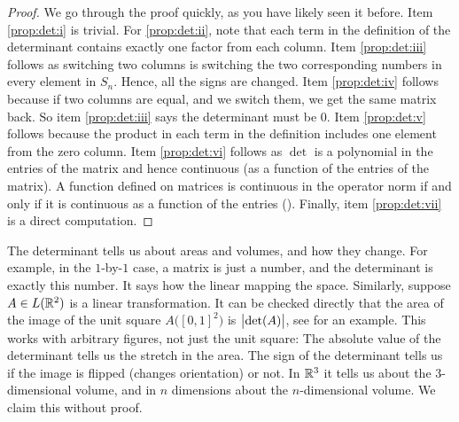 \begin{proof}
We go through the proof quickly, as you have likely seen it before.
%
Item \ref{prop:det:i} is trivial.  For \ref{prop:det:ii}, note that each term in the definition of the
determinant contains exactly one factor from each column.
%
Item \ref{prop:det:iii} follows as switching two columns is switching the
two corresponding numbers in every element in $S_n$.  Hence, all the signs
are changed.
Item \ref{prop:det:iv} follows because if two columns are equal, and we
switch them, we get
the same matrix back.  So item \ref{prop:det:iii} says the determinant must be 0.
%
Item \ref{prop:det:v} follows because the product in each term in the definition includes
one element from the zero column.
Item \ref{prop:det:vi} follows as $\det$ is a polynomial in the entries of the matrix
and hence continuous (as a function of the entries of the matrix).
A function defined on
matrices is continuous in the operator norm if and only if it is 
continuous as a function of the entries ().
Finally, item \ref{prop:det:vii} is a direct computation.
\end{proof}

The determinant tells us about areas and volumes, and how they change.
For example, in the $1$-by-$1$ case, a matrix is just a number, and the
determinant is exactly this number.  It says how the linear mapping
 the space.  Similarly,
suppose $A \in L({\mathbb{R}}^2)$ is a linear transformation.
It can be checked directly that
the area of the image of the unit square $A\bigl([0,1]^2\bigr)$ is
$\bigl\lvert {\det(A)} \bigr\rvert$, see  for an example.
This works with arbitrary figures, not just the unit
square:
The absolute value of the determinant tells us the stretch in the area.
The sign of the determinant tells us if the image is
flipped (changes orientation) or not.
In ${\mathbb{R}}^3$ it
tells us about the 3-dimensional volume, and in $n$ dimensions about the
$n$-dimensional volume.  We claim this without proof.
\begin{myfigureht}
\caption{Image of the unit square ${[0,1]}^2$ via the matrix
$\left[\begin{smallmatrix}1 & 1 \\ -1 & 1\end{smallmatrix}\right]$.
The image is a square of side $\sqrt{2}$, thus of area 2, and the determinant of the
matrix is 2.\label{fig:imagesquare}}
\end{myfigureht}

